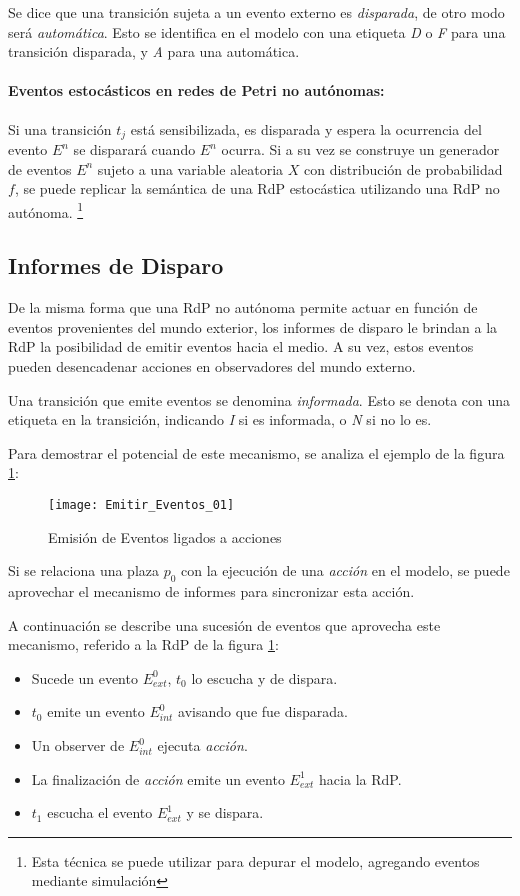 Se dice que una transición sujeta a un evento externo es \textit{disparada}, de
otro modo será \textit{automática}. Esto se identifica en el modelo con una
etiqueta \textit{D} o \textit{F} para una transición disparada, y \textit{A}
para una automática.

\paragraph{Eventos estocásticos en redes de Petri no autónomas:}
Si una transición $t_{j}$ está sensibilizada, es disparada y espera la
ocurrencia del evento $E^{n}$ se disparará cuando $E^{n}$ ocurra.
Si a su vez se construye un generador de eventos $E^{n}$ sujeto a una variable
aleatoria $X$ con distribución de probabilidad $f$, se puede replicar la
semántica de una RdP estocástica utilizando una RdP no autónoma.
\footnote{Esta técnica se puede utilizar para depurar el modelo, agregando
eventos mediante simulación}

\subsection{Informes de Disparo}
\label{informes_disparo}
De la misma forma que una RdP no autónoma permite actuar en función de eventos
provenientes del mundo exterior, los informes de disparo le brindan a la RdP la
posibilidad de emitir eventos hacia el medio. A su vez, estos eventos pueden
desencadenar acciones en observadores del mundo externo.

Una transición que emite eventos se denomina \textit{informada}.
Esto se denota con una etiqueta en la transición, indicando \textit{I} si es
informada, o \textit{N} si no lo es.

Para demostrar el potencial de este mecanismo, se analiza el ejemplo de la
figura \ref{fig:eventos01}:

\begin{figure}[h]
  \centering
  \texttt{[image: Emitir\_Eventos\_01]}
  \caption{Emisión de Eventos ligados a acciones}
  \label{fig:eventos01}
\end{figure}

Si se relaciona una plaza $p_{0}$ con la ejecución de una
\textit{acción} en el modelo, se puede aprovechar el mecanismo
de informes para sincronizar esta acción.

A continuación se describe una sucesión de eventos que aprovecha este
mecanismo, referido a la RdP de la figura \ref{fig:eventos01}:
\begin{itemize}
  \item Sucede un evento $E_{ext}^{0}$, $t_{0}$ lo escucha y de dispara.
  \item $t_{0}$ emite un evento $E_{int}^{0}$ avisando que fue disparada.
  \item Un observer de $E_{int}^{0}$ ejecuta \textit{acción}.
  \item La finalización de \textit{acción} emite un evento
  $E_{ext}^{1}$ hacia la RdP.
  \item $t_{1}$ escucha el evento $E_{ext}^{1}$ y se dispara.
\end{itemize}

